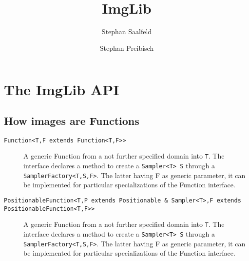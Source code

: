 \documentclass[a4paper,10pt]{report}
\title{ImgLib}
\author{Stephan Saalfeld \and Stephan Preibisch}
\begin{document}
\maketitle

\begin{abstract}

\end{abstract}

\chapter{The ImgLib API}


\section{How images are Functions}

\begin{description}
	\item[{\tt{}Function<T,F extends Function<T,F>>}]{A generic Function from a not further specified domain into {\tt{}T}.  The interface declares a method to create a {\tt{Sampler<T> S}} through a {\tt{SamplerFactory<T,S,F>}}.  The latter having F as generic parameter, it can be implemented for particular specializations of the Function interface.}
	\item[{\tt{}PositionableFunction<T,P extends Positionable \& Sampler<T>,F extends PositionableFunction<T,F>>}]{A generic Function from a not further specified domain into {\tt{}T}.  The interface declares a method to create a {\tt{Sampler<T> S}} through a {\tt{SamplerFactory<T,S,F>}}.  The latter having F as generic parameter, it can be implemented for particular specializations of the Function interface.}
\end{description}
\end{document}
